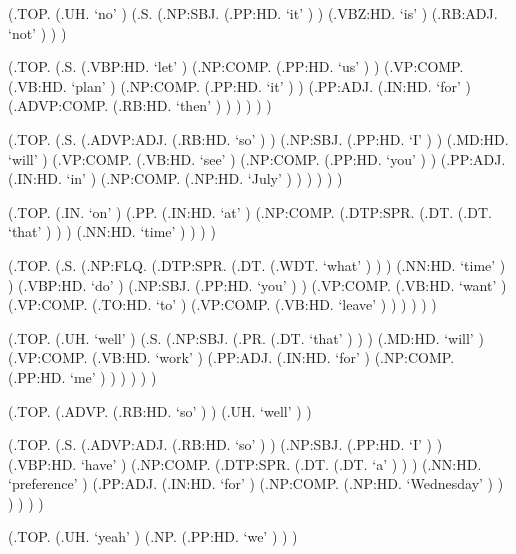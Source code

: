 \documentclass[10pt]{article}
\begin{document}
\begin{parsetree}  (.TOP. (.UH. `no' ) (.S. (.NP:SBJ. (.PP:HD. `it' ) ) (.VBZ:HD. `is' ) (.RB:ADJ. `not' ) ) ) \end{parsetree}

\begin{parsetree}  (.TOP. (.S. (.VBP:HD. `let' ) (.NP:COMP. (.PP:HD. `us' ) ) (.VP:COMP. (.VB:HD. `plan' ) (.NP:COMP. (.PP:HD. `it' ) ) (.PP:ADJ. (.IN:HD. `for' ) (.ADVP:COMP. (.RB:HD. `then' ) ) ) ) ) ) \end{parsetree}

\begin{parsetree}  (.TOP. (.S. (.ADVP:ADJ. (.RB:HD. `so' ) ) (.NP:SBJ. (.PP:HD. `I' ) ) (.MD:HD. `will' ) (.VP:COMP. (.VB:HD. `see' ) (.NP:COMP. (.PP:HD. `you' ) ) (.PP:ADJ. (.IN:HD. `in' ) (.NP:COMP. (.NP:HD. `July' ) ) ) ) ) ) \end{parsetree}

\begin{parsetree}  (.TOP. (.IN. `on' ) (.PP. (.IN:HD. `at' ) (.NP:COMP. (.DTP:SPR. (.DT. (.DT. `that' ) ) ) (.NN:HD. `time' ) ) ) ) \end{parsetree}

\begin{parsetree}  (.TOP. (.S. (.NP:FLQ. (.DTP:SPR. (.DT. (.WDT. `what' ) ) ) (.NN:HD. `time' ) ) (.VBP:HD. `do' ) (.NP:SBJ. (.PP:HD. `you' ) ) (.VP:COMP. (.VB:HD. `want' ) (.VP:COMP. (.TO:HD. `to' ) (.VP:COMP. (.VB:HD. `leave' ) ) ) ) ) ) \end{parsetree}

\begin{parsetree}  (.TOP. (.UH. `well' ) (.S. (.NP:SBJ. (.PR. (.DT. `that' ) ) ) (.MD:HD. `will' ) (.VP:COMP. (.VB:HD. `work' ) (.PP:ADJ. (.IN:HD. `for' ) (.NP:COMP. (.PP:HD. `me' ) ) ) ) ) ) \end{parsetree}

\begin{parsetree}  (.TOP. (.ADVP. (.RB:HD. `so' ) ) (.UH. `well' ) ) \end{parsetree}

\begin{parsetree}  (.TOP. (.S. (.ADVP:ADJ. (.RB:HD. `so' ) ) (.NP:SBJ. (.PP:HD. `I' ) ) (.VBP:HD. `have' ) (.NP:COMP. (.DTP:SPR. (.DT. (.DT. `a' ) ) ) (.NN:HD. `preference' ) (.PP:ADJ. (.IN:HD. `for' ) (.NP:COMP. (.NP:HD. `Wednesday' ) ) ) ) ) ) \end{parsetree}

\begin{parsetree}  (.TOP. (.UH. `yeah' ) (.NP. (.PP:HD. `we' ) ) ) \end{parsetree}
\end{document}
